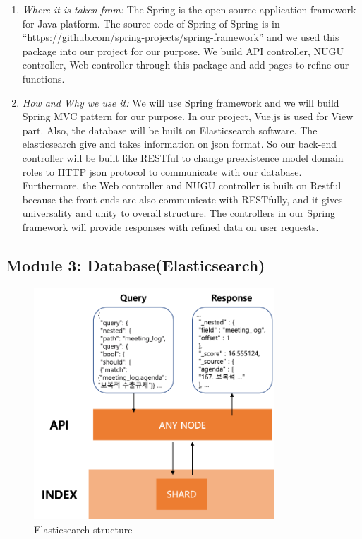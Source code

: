\documentclass[conference]{IEEEtran}
\begin{document}
\begin{enumerate}
\begin{enumerate}
 \end{enumerate}  
 
   \item \textit{Where it is taken from: } The Spring is the open source application framework for Java platform. The source code of Spring of Spring is in “https://github.com/spring-projects/spring-framework” and we used this package into our project for our purpose. We build API controller, NUGU controller, Web controller through this package and add pages to refine our functions.\\
  \item \textit{How and Why we use it: } We will use Spring framework and we will build Spring MVC pattern for our purpose. In our project, Vue.js is used for View part. Also, the database will be built on Elasticsearch software. The elasticsearch give and takes information on json format. So our back-end controller will be built like RESTful to change preexistence model domain roles to HTTP json protocol to communicate with our database. Furthermore, the Web controller and NUGU controller is built on Restful because the front-ends are also communicate with RESTfully, and it gives universality and unity to overall structure. The controllers in our Spring framework will provide responses with refined data on user requests.\\
  \end{enumerate}
\clearpage


  \subsection{Module 3: Database(Elasticsearch)}
\begin{figure}[htbp]
\centerline{\includegraphics[width=90mm,scale=0.5]{fig/6_8.png}}
\caption{Elasticsearch structure}
\label{fig}
\end{figure}
\end{document}
